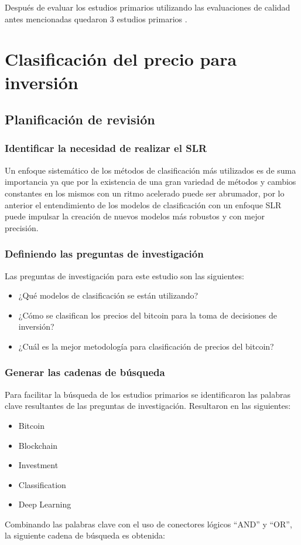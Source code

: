 Después de evaluar los estudios primarios utilizando las evaluaciones de calidad antes mencionadas quedaron 3 estudios primarios \parencite{chenMachineLearningModel2021,jiBestFeatureSelection2019,saadCharacterizingBlockchainbasedCryptocurrencies2018}.

\section{Clasificación del precio para inversión}

\subsection{Planificación de revisión}
\subsubsection{Identificar la necesidad de realizar el SLR}

Un enfoque sistemático de los métodos de clasificación más utilizados es de suma importancia ya que por la existencia de una gran variedad de métodos y cambios constantes en los mismos con un ritmo acelerado puede ser abrumador, por lo anterior el entendimiento de los modelos de clasificación con un enfoque SLR puede impulsar la creación de nuevos modelos más robustos y con mejor precisión.\\

\subsubsection{Definiendo las preguntas de investigación}
Las preguntas de investigación para este estudio son las siguientes:
\begin{itemize}
	\item ¿Qué modelos de clasificación se están utilizando?
	\item ¿Cómo se clasifican los precios del bitcoin para la toma de decisiones de inversión?
	\item ¿Cuál es la mejor metodología para clasificación de precios del bitcoin?
\end{itemize}

\subsubsection{Generar las cadenas de búsqueda}
Para facilitar la búsqueda de los estudios primarios se identificaron las palabras clave resultantes de las preguntas de investigación. Resultaron en las siguientes:
\begin{itemize}
	\item Bitcoin
	\item Blockchain
	\item Investment
	\item Classification
	\item Deep Learning
\end{itemize}
Combinando las palabras clave con el uso de conectores lógicos “AND” y “OR”, la siguiente cadena de búsqueda es obtenida:\\


